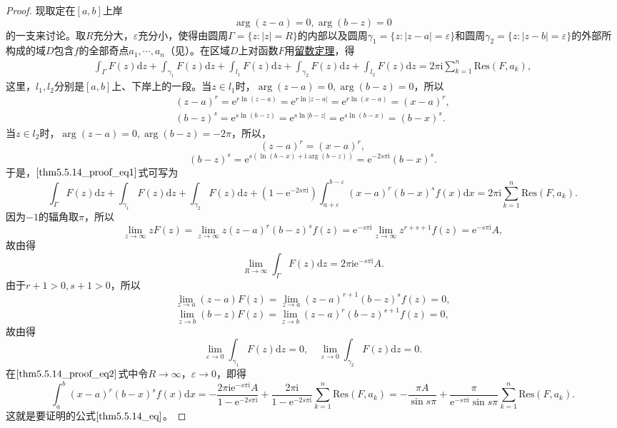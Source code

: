 \documentclass[../../main.tex]{subfiles}%
\begin{document}
\begin{proof}
现取定在\([a, b]\)上岸
\[
\arg(z - a) = 0, \arg(b - z) = 0
\]
的一支来讨论。取\( R \)充分大，\( \varepsilon \)充分小，使得由圆周\( \Gamma = \{ z : |z| = R \} \)的内部以及圆周\( \gamma_1 = \{ z : |z - a| = \varepsilon \} \)和圆周\( \gamma_2 = \{ z : |z - b| = \varepsilon \} \)的外部所构成的域\( D \)包含\( f \)的全部奇点\( a_1, \cdots, a_n \)（见）。在区域\( D \)上对函数\( F \)用\hyperref[theorem:留数定理(残数定理)-定理5.4.9]{留数定理}，得
\begin{align}
\int_{\Gamma} F(z) \mathrm{d}z + \int_{\gamma_1} F(z) \mathrm{d}z + \int_{l_1} F(z) \mathrm{d}z + \int_{\gamma_2} F(z) \mathrm{d}z + \int_{l_2} F(z) \mathrm{d}z
= 2\pi \mathrm{i} \sum_{k = 1}^{n} \mathrm{Res}(F, a_k), \label{thm5.5.14_proof_eq1}
\end{align}
这里，\( l_1, l_2 \)分别是\([a, b]\)上、下岸上的一段。当\( z \in l_1 \)时，\(\arg(z - a) = 0, \arg(b - z) = 0\)，所以
\begin{gather*}
(z - a)^r = \mathrm{e}^{r \ln(z - a)} = \mathrm{e}^{r \ln|z - a|}
= \mathrm{e}^{r \ln(x - a)} = (x - a)^r,
\\
(b - z)^s = \mathrm{e}^{s \ln(b - z)} = \mathrm{e}^{s \ln|b - z|}
= \mathrm{e}^{s \ln(b - x)} = (b - x)^s.
\end{gather*}
当\( z \in l_2 \)时，\(\arg(z - a) = 0, \arg(b - z) = -2\pi\)，所以，
\[
(z - a)^r = (x - a)^r,
\]
\[
(b - z)^s = \mathrm{e}^{s(\ln(b - x) + \mathrm{i} \arg(b - z))}
= \mathrm{e}^{-2s\pi \mathrm{i}} (b - x)^s.
\]
于是，\(\eqref{thm5.5.14_proof_eq1}\)式可写为
\[
\int_{\Gamma} F(z) \mathrm{d}z + \int_{\gamma_1} F(z) \mathrm{d}z + \int_{\gamma_2} F(z) \mathrm{d}z
+ (1 - \mathrm{e}^{-2s\pi \mathrm{i}}) \int_{a + \varepsilon}^{b - \varepsilon} (x - a)^r (b - x)^s f(x) \mathrm{d}x
= 2\pi \mathrm{i} \sum_{k = 1}^{n} \mathrm{Res}(F, a_k). \label{thm5.5.14_proof_eq2}
\]
因为\(-1\)的辐角取\(\pi\)，所以
\[
\lim_{z \to \infty} z F(z) = \lim_{z \to \infty} z (z - a)^r (b - z)^s f(z)
= \mathrm{e}^{-s\pi \mathrm{i}} \lim_{z \to \infty} z^{r + s + 1} f(z)
= \mathrm{e}^{-s\pi \mathrm{i}} A,
\]
故由得
\[
\lim_{R \to \infty} \int_{\Gamma} F(z) \mathrm{d}z = 2\pi \mathrm{i} \mathrm{e}^{-s\pi \mathrm{i}} A.
\]
由于\( r + 1 > 0, s + 1 > 0 \)，所以
\[
\lim_{z \to a} (z - a) F(z) = \lim_{z \to a} (z - a)^{r + 1} (b - z)^s f(z)
= 0,
\]
\[
\lim_{z \to b} (b - z) F(z) = \lim_{z \to b} (z - a)^r (b - z)^{s + 1} f(z)
= 0,
\]
故由得
\[
\lim_{\varepsilon \to 0} \int_{\gamma_1} F(z) \mathrm{d}z = 0,
\quad
\lim_{\varepsilon \to 0} \int_{\gamma_2} F(z) \mathrm{d}z = 0.
\]
在\(\eqref{thm5.5.14_proof_eq2}\)式中令\( R \to \infty \)，\( \varepsilon \to 0 \)，即得
\[
\int_{a}^{b} (x - a)^r (b - x)^s f(x) \mathrm{d}x
= -\frac{2\pi \mathrm{i} \mathrm{e}^{-s\pi \mathrm{i}} A}{1 - \mathrm{e}^{-2s\pi \mathrm{i}}} + \frac{2\pi \mathrm{i}}{1 - \mathrm{e}^{-2s\pi \mathrm{i}}} \sum_{k = 1}^{n} \mathrm{Res}(F, a_k)
= -\frac{\pi A}{\sin s\pi} + \frac{\pi}{\mathrm{e}^{-s\pi \mathrm{i}} \sin s\pi} \sum_{k = 1}^{n} \mathrm{Res}(F, a_k).
\]
这就是要证明的公式\(\eqref{thm5.5.14_eq}\)。
\end{proof}
\end{document}
